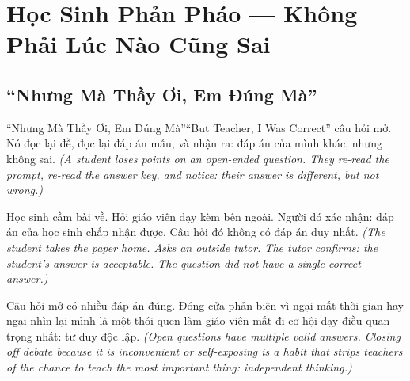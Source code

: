 
\chapter{Học Sinh Phản Pháo --- Không Phải Lúc Nào Cũng Sai}

\section{``Nhưng Mà Thầy Ơi, Em Đúng Mà''}
\begin{truyen}{``Nhưng Mà Thầy Ơi, Em Đúng Mà''}{``But Teacher, I Was Correct''}
 câu hỏi mở. Nó đọc lại đề, đọc lại đáp án mẫu, và nhận ra: đáp án của mình khác, nhưng không sai.
\textit{(A student loses points on an open-ended question. They re-read the prompt, re-read the answer key, and notice: their answer is different, but not wrong.)}



Học sinh cầm bài về. Hỏi giáo viên dạy kèm bên ngoài. Người đó xác nhận: đáp án của học sinh chấp nhận được. Câu hỏi đó không có đáp án duy nhất.
\textit{(The student takes the paper home. Asks an outside tutor. The tutor confirms: the student's answer is acceptable. The question did not have a single correct answer.)}

\begin{baihoc}
Câu hỏi mở có nhiều đáp án đúng. Đóng cửa phản biện vì ngại mất thời gian hay ngại nhìn lại mình là một thói quen làm giáo viên mất đi cơ hội dạy điều quan trọng nhất: tư duy độc lập.
\textit{(Open questions have multiple valid answers. Closing off debate because it is inconvenient or self-exposing is a habit that strips teachers of the chance to teach the most important thing: independent thinking.)}
\end{baihoc}
\end{truyen}


